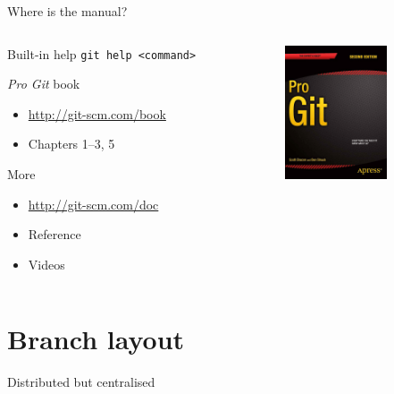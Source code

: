 \documentclass{beamer}
\begin{document}
\begin{frame}{Where is the manual?}
  \begin{columns}[t]
    \begin{column}{7cm}
      \begin{block}{Built-in help}
        \texttt{git help <command>}
      \end{block}
      \begin{block}{\emph{Pro Git} book}
        \begin{itemize}
        \item \url{http://git-scm.com/book}
        \item Chapters 1--3, 5
        \end{itemize}
      \end{block}
      \begin{block}{More}
        \begin{itemize}
        \item \url{http://git-scm.com/doc}
        \item Reference
        \item Videos
        \end{itemize}
      \end{block}
    \end{column}
    \begin{column}{3cm}
      \begin{center}
        \includegraphics[width=3cm]{images/progit2.png}
      \end{center}
    \end{column}
  \end{columns}
\end{frame}

\section{Branch layout}
\begin{frame}{Distributed but centralised}
  \begin{center}
  \end{center}
\end{frame}
\end{document}
